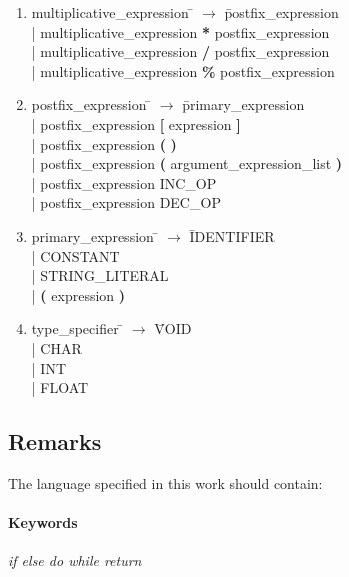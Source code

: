 \documentclass[11pt]{article}
\begin{document}
\begin{enumerate}
\item \begin{tabbing} multiplicative{\_}expression \= $\to$ \= postfix{\_}expression \\
	\> | \> multiplicative{\_}expression \textbf{*} postfix{\_}expression \\
	\> | \> multiplicative{\_}expression \textbf{/} postfix{\_}expression \\
	\> | \> multiplicative{\_}expression \textbf{\%} postfix{\_}expression
\end{tabbing}

\item \begin{tabbing} postfix{\_}expression \= $\to$ \= primary{\_}expression \\
	\> | \> postfix{\_}expression \textbf{[} expression \textbf{]} \\
	\> | \> postfix{\_}expression \textbf{(} \textbf{)} \\
	\> | \> postfix{\_}expression \textbf{(} argument{\_}expression{\_}list \textbf{)} \\
	\> | \> postfix{\_}expression INC{\_}OP \\
	\> | \> postfix{\_}expression DEC{\_}OP
\end{tabbing}

\item \begin{tabbing} primary{\_}expression \= $\to$ \= IDENTIFIER \\
	\> | \> CONSTANT \\
	\> | \> STRING{\_}LITERAL \\
	\> | \> \textbf{(} expression \textbf{)}
\end{tabbing}

\item \begin{tabbing} type{\_}specifier \= $\to$ \= VOID \\
	\> | \> CHAR \\
	\> | \> INT \\
	\> | \> FLOAT
\end{tabbing}


\end{enumerate}
\normalsize

\subsection{Remarks}
The language specified in this work should contain:

\paragraph{Keywords} \textit{if else do while return}
\end{document}
